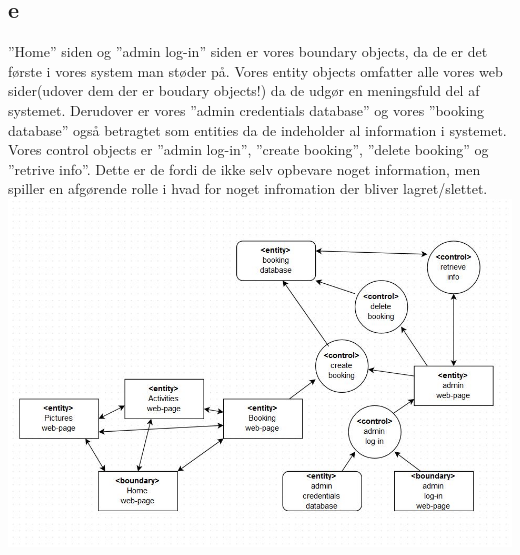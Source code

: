 \documentclass[12pt,a4paper]{article}
\begin{document}
\subsection{e}
”Home” siden og ”admin log-in” siden er vores  boundary objects, da de er det første i vores system man støder på.
Vores entity objects omfatter alle vores web sider(udover dem der er boudary objects!) da de udgør en meningsfuld del af systemet. Derudover er vores ”admin credentials database” og vores ”booking database” også betragtet som entities da de indeholder al information i systemet.
Vores control objects er ”admin log-in”, ”create booking”, ”delete booking” og ”retrive info”. Dette er de fordi de ikke selv opbevare noget information, men spiller en afgørende rolle i hvad for noget infromation der bliver lagret/slettet. \\
\includegraphics[scale=0.6]{BCE.jpg}
\end{document}
